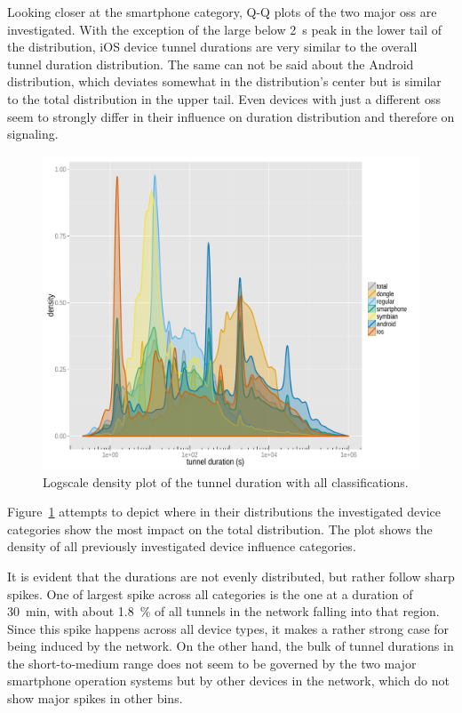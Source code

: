 Looking closer at the smartphone category, Q-Q plots of the two major \glspl{os} are investigated. With the exception of the large below \SI{2}{\second} peak in the lower tail of the distribution, iOS device tunnel durations are very similar to the overall tunnel duration distribution. The same can not be said about the Android distribution, which deviates somewhat in the distribution's center but is similar to the total distribution in the upper tail. Even devices with just a different \glspl{os} seem to strongly differ in their influence on duration distribution and therefore on signaling.

\begin{figure}[htb]
	\centering
	\includegraphics[width=1.0\textwidth]{images/R-duration-classification-density.pdf}
	\caption{Logscale density plot of the tunnel duration with all classifications.}
\label{c4:fig:durations-density}
\end{figure}


Figure~\ref{c4:fig:durations-density} attempts to depict where in their distributions the investigated device categories show the most impact on the total distribution. The plot shows the density of all previously investigated device influence categories.

It is evident that the durations are not evenly distributed, but rather follow sharp spikes. One of largest spike across all categories is the one at a duration of \SI{30}{\minute}, with about \SI{1.8}{\percent} of all tunnels in the network falling into that region. Since this spike happens across all device types, it makes a rather strong case for being induced by the network. On the other hand, the bulk of tunnel durations in the short-to-medium range does not seem to be governed by the two major smartphone operation systems but by other devices in the network, which do not show major spikes in other bins.

